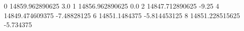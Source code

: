 0 14859.962890625 3.0
1 14856.962890625 0.0
2 14847.712890625 -9.25
4 14849.474609375 -7.48828125
6 14851.1484375 -5.814453125
8 14851.228515625 -5.734375
